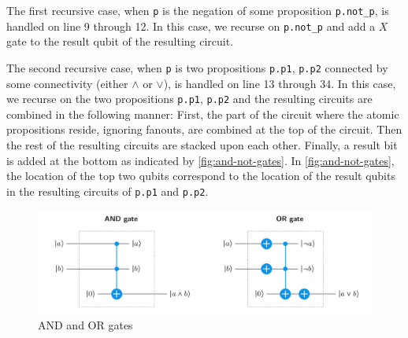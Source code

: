 The first recursive case, when \texttt{p} is the negation of some proposition \texttt{p.not\_p}, is handled on line 9 through 12.
In this case, we recurse on \texttt{p.not\_p} and add a $X$ gate to the result qubit of the resulting circuit.

The second recursive case, when \texttt{p} is two propositions \texttt{p.p1}, \texttt{p.p2} connected by some connectivity (either $\land$ or $\lor$), is handled on line 13 through 34.
In this case, we recurse on the two propositions \texttt{p.p1}, \texttt{p.p2} and the resulting circuits are combined in the following manner:
First, the part of the circuit where the atomic propositions reside, ignoring fanouts, are combined at the top of the circuit.
Then the rest of the resulting circuits are stacked upon each other.
Finally, a result bit is added at the bottom as indicated by \autoref{fig:and-not-gates}.
In \autoref{fig:and-not-gates}, the location of the top two qubits correspond to the location of the result qubits in the resulting circuits of \texttt{p.p1} and \texttt{p.p2}.

\begin{figure}[H]
    \centering
    \includegraphics[width=\textwidth]{figures/AND-and-OR-with-Toffoli.jpg}
    \caption{AND and OR gates}
    \label{fig:and-not-gates}
\end{figure}

